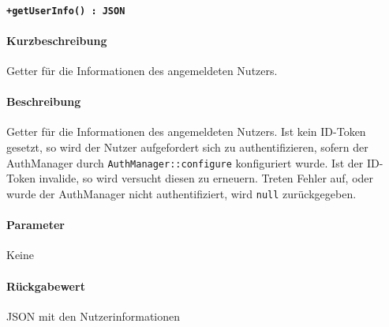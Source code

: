 \paragraph{\texttt{+getUserInfo() : JSON}}%
\paragraph*{Kurzbeschreibung}
Getter für die Informationen des angemeldeten Nutzers.
\paragraph*{Beschreibung}
Getter für die Informationen des angemeldeten Nutzers.
Ist kein ID-Token gesetzt, so wird der Nutzer aufgefordert sich zu authentifizieren, sofern der AuthManager durch \verb#AuthManager::configure# konfiguriert wurde.
Ist der ID-Token invalide, so wird versucht diesen zu erneuern.
Treten Fehler auf, oder wurde der AuthManager nicht authentifiziert, wird \verb#null# zurückgegeben.
\paragraph*{Parameter}
Keine
\paragraph*{Rückgabewert}
JSON mit den Nutzerinformationen